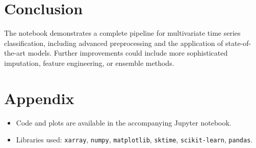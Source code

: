 \documentclass[a4paper,11pt]{article}
\begin{document}
\section{Conclusion}
The notebook demonstrates a complete pipeline for multivariate time series classification, including advanced preprocessing and the application of state-of-the-art models. Further improvements could include more sophisticated imputation, feature engineering, or ensemble methods.

\section*{Appendix}
\begin{itemize}
    \item Code and plots are available in the accompanying Jupyter notebook.
    \item Libraries used: \texttt{xarray}, \texttt{numpy}, \texttt{matplotlib}, \texttt{sktime}, \texttt{scikit-learn}, \texttt{pandas}.
\end{itemize}
\end{document}
